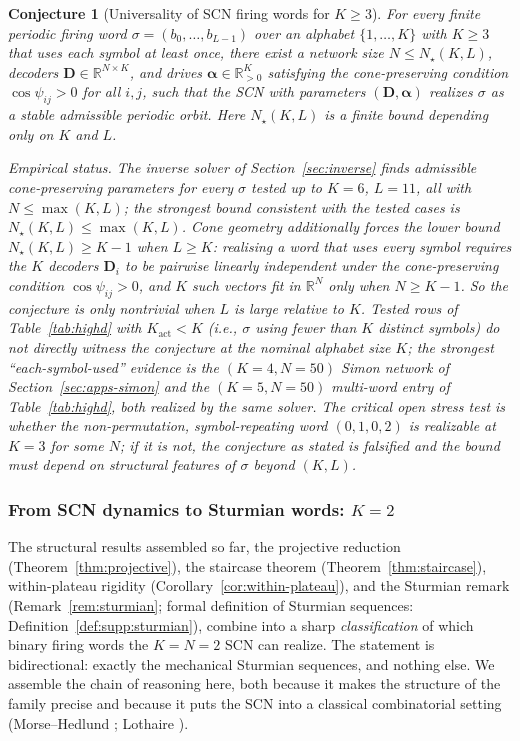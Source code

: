 \documentclass[12pt]{article}
\newcommand{\vv}[1]{\mathbf{#1}}
\newcommand{\DD}{\vv{D}}
\newcommand{\RR}{\mathbb{R}}
\newtheorem{conjecture}{Conjecture}
\begin{document}
\begin{conjecture}[Universality of SCN firing words for $K{\geq}3$]\label{conj:universality}
For every finite periodic firing word $\sigma=(b_0,\ldots,b_{L-1})$ over an alphabet $\{1,\ldots,K\}$ with $K\geq 3$ that uses each symbol at least once, there exist a network size $N\leq N_\star(K,L)$, decoders $\vv{D}\in\RR^{N\times K}$, and drives $\boldsymbol{\alpha}\in\RR_{>0}^{K}$ satisfying the cone-preserving condition $\cos\psi_{ij}>0$ for all $i,j$, such that the SCN with parameters $(\vv{D},\boldsymbol{\alpha})$ realizes $\sigma$ as a stable admissible periodic orbit. Here $N_\star(K,L)$ is a finite bound depending only on $K$ and $L$.

\emph{Empirical status.} The inverse solver of Section~\ref{sec:inverse} finds admissible cone-preserving parameters for every $\sigma$ tested up to $K=6$, $L=11$, all with $N\leq \max(K,L)$; the strongest bound consistent with the tested cases is $N_\star(K,L)\leq\max(K,L)$. Cone geometry additionally forces the lower bound $N_\star(K,L)\geq K-1$ when $L\geq K$: realising a word that uses every symbol requires the $K$ decoders $\DD_i$ to be pairwise linearly independent under the cone-preserving condition $\cos\psi_{ij}>0$, and $K$ such vectors fit in $\RR^N$ only when $N\geq K-1$. So the conjecture is only nontrivial when $L$ is large relative to $K$. Tested rows of Table~\ref{tab:highd} with $K_{\text{act}}<K$ (i.e., $\sigma$ using fewer than $K$ distinct symbols) do not directly witness the conjecture at the nominal alphabet size $K$; the strongest ``each-symbol-used'' evidence is the $(K=4,N=50)$ Simon network of Section~\ref{sec:apps-simon} and the $(K=5,N=50)$ multi-word entry of Table~\ref{tab:highd}, both realized by the same solver. The critical open stress test is whether the non-permutation, symbol-repeating word $(0,1,0,2)$ is realizable at $K=3$ for some $N$; if it is not, the conjecture as stated is falsified and the bound must depend on structural features of $\sigma$ beyond $(K,L)$.
\end{conjecture}

\subsubsection{From SCN dynamics to Sturmian words: $K{=}2$}\label{sec:sturmian-chain}

The structural results assembled so far, the projective reduction (Theorem~\ref{thm:projective}), the staircase theorem (Theorem~\ref{thm:staircase}), within-plateau rigidity (Corollary~\ref{cor:within-plateau}), and the Sturmian remark (Remark~\ref{rem:sturmian}; formal definition of Sturmian sequences: Definition~\ref{def:supp:sturmian}), combine into a sharp \emph{classification} of which binary firing words the $K{=}N{=}2$ SCN can realize. The statement is bidirectional: exactly the mechanical Sturmian sequences, and nothing else. We assemble the chain of reasoning here, both because it makes the structure of the family precise and because it puts the SCN into a classical combinatorial setting (Morse--Hedlund \citeyearpar{morse1938symbolic,morse1940symbolic}; Lothaire \citeyearpar{lothaire2002algebraic}).
\end{document}
